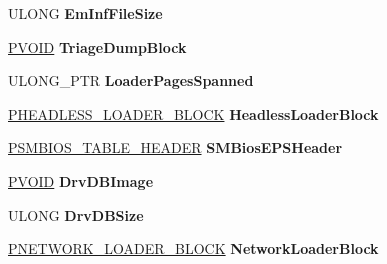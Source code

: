 \begin{DoxyCompactItemize}
U\+L\+O\+NG {\bfseries Em\+Inf\+File\+Size}
\item 
\mbox{\label{struct___l_o_a_d_e_r___p_a_r_a_m_e_t_e_r___e_x_t_e_n_s_i_o_n_aa54a36b985e4e6496be3783aeac58ca6}} 
\hyperlink{interfacevoid}{P\+V\+O\+ID} {\bfseries Triage\+Dump\+Block}
\item 
\mbox{\label{struct___l_o_a_d_e_r___p_a_r_a_m_e_t_e_r___e_x_t_e_n_s_i_o_n_a8e78109fc8a7e3286107c97c64a1f13f}} 
U\+L\+O\+N\+G\+\_\+\+P\+TR {\bfseries Loader\+Pages\+Spanned}
\item 
\mbox{\label{struct___l_o_a_d_e_r___p_a_r_a_m_e_t_e_r___e_x_t_e_n_s_i_o_n_ac5cbb0513a2505fc98b2f154cda0444e}} 
\hyperlink{struct___h_e_a_d_l_e_s_s___l_o_a_d_e_r___b_l_o_c_k}{P\+H\+E\+A\+D\+L\+E\+S\+S\+\_\+\+L\+O\+A\+D\+E\+R\+\_\+\+B\+L\+O\+CK} {\bfseries Headless\+Loader\+Block}
\item 
\mbox{\label{struct___l_o_a_d_e_r___p_a_r_a_m_e_t_e_r___e_x_t_e_n_s_i_o_n_ae4468f1be17a4b8b84d227b018fb5863}} 
\hyperlink{struct___s_m_b_i_o_s___t_a_b_l_e___h_e_a_d_e_r}{P\+S\+M\+B\+I\+O\+S\+\_\+\+T\+A\+B\+L\+E\+\_\+\+H\+E\+A\+D\+ER} {\bfseries S\+M\+Bios\+E\+P\+S\+Header}
\item 
\mbox{\label{struct___l_o_a_d_e_r___p_a_r_a_m_e_t_e_r___e_x_t_e_n_s_i_o_n_ab322a3b5429d52dd71aad167f8e16e99}} 
\hyperlink{interfacevoid}{P\+V\+O\+ID} {\bfseries Drv\+D\+B\+Image}
\item 
\mbox{\label{struct___l_o_a_d_e_r___p_a_r_a_m_e_t_e_r___e_x_t_e_n_s_i_o_n_a231aa8123ee27a7e5545e845d4592b7b}} 
U\+L\+O\+NG {\bfseries Drv\+D\+B\+Size}
\item 
\mbox{\label{struct___l_o_a_d_e_r___p_a_r_a_m_e_t_e_r___e_x_t_e_n_s_i_o_n_afe90f3660c9da7c16686315c27941053}} 
\hyperlink{struct___n_e_t_w_o_r_k___l_o_a_d_e_r___b_l_o_c_k}{P\+N\+E\+T\+W\+O\+R\+K\+\_\+\+L\+O\+A\+D\+E\+R\+\_\+\+B\+L\+O\+CK} {\bfseries Network\+Loader\+Block}

\end{DoxyCompactItemize}

